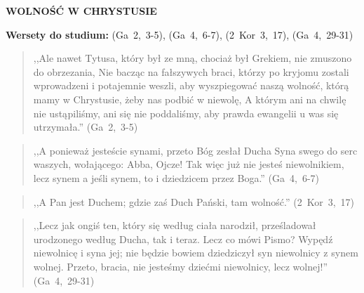 \documentclass[10pt,a4paper,oneside]{article}
\begin{document}
\centerline{\textbf{\MakeUppercase{Wolność w Chrystusie}}}
\begin{center}
\textbf{Wersety do studium:} \mbox{(Ga 2, 3-5)}, \mbox{(Ga 4, 6-7)}, \mbox{(2 Kor 3, 17)}, \mbox{(Ga 4, 29-31)}
\end{center}
\begin{quote}
,,Ale nawet Tytusa, który był ze mną, chociaż był Grekiem, nie zmuszono do obrzezania, Nie bacząc na fałszywych braci, którzy po kryjomu zostali wprowadzeni i potajemnie weszli, aby wyszpiegować naszą wolność, którą mamy w Chrystusie, żeby nas podbić w niewolę, A którym ani na chwilę nie ustąpiliśmy, ani się nie poddaliśmy, aby prawda ewangelii u was się utrzymała.'' \mbox{(Ga 2, 3-5)}
\end{quote}
\begin{quote}
,,A ponieważ jesteście synami, przeto Bóg zesłał Ducha Syna swego do serc waszych, wołającego: Abba, Ojcze! Tak więc już nie jesteś niewolnikiem, lecz synem a jeśli synem, to i dziedzicem przez Boga.'' \mbox{(Ga 4, 6-7)}
\end{quote}
\begin{quote}
,,A Pan jest Duchem; gdzie zaś Duch Pański, tam wolność.'' \mbox{(2 Kor 3, 17)}
\end{quote}
\begin{quote}
,,Lecz jak ongiś ten, który się według ciała narodził, prześladował urodzonego według Ducha, tak i teraz. Lecz co mówi Pismo? Wypędź niewolnicę i syna jej; nie będzie bowiem dziedziczył syn niewolnicy z synem wolnej. Przeto, bracia, nie jesteśmy dziećmi niewolnicy, lecz wolnej!'' \mbox{(Ga 4, 29-31)}
\end{quote}
\end{document}
